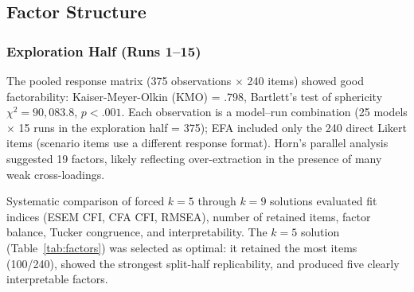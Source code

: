 \documentclass[11pt]{article}
\newcommand{\ndirect}{240}
\newcommand{\nretained}{100}
\begin{document}
\subsection{Factor Structure}
\label{sec:factor-structure}

\subsubsection{Exploration Half (Runs 1--15)}

The pooled response matrix (375 observations $\times$ \ndirect{} items) showed good factorability: Kaiser-Meyer-Olkin (KMO) = .798, Bartlett's test of sphericity $\chi^2 = 90{,}083.8$, $p < .001$.
Each observation is a model--run combination (25 models $\times$ 15 runs in the exploration half = 375); EFA included only the \ndirect{} direct Likert items (scenario items use a different response format).
Horn's parallel analysis suggested 19 factors, likely reflecting over-extraction in the presence of many weak cross-loadings.

Systematic comparison of forced $k = 5$ through $k = 9$ solutions evaluated fit indices (ESEM CFI, CFA CFI, RMSEA), number of retained items, factor balance, Tucker congruence, and interpretability.
The $k = 5$ solution (Table~\ref{tab:factors}) was selected as optimal: it retained the most items (\nretained{}/\ndirect{}), showed the strongest split-half replicability, and produced five clearly interpretable factors.
\end{document}
